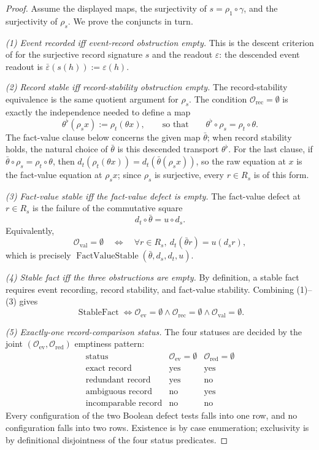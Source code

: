 \begin{proof}
Assume the displayed maps, the surjectivity of \(s=\rho_1\circ\gamma\),
and the surjectivity of \(\rho_s\).  We prove the conjuncts in
turn.

\emph{(1) Event recorded iff event-record obstruction empty.}
This is the descent criterion of  for the
surjective record signature \(s\) and the readout \(\varepsilon\): the
descended event readout is \(\bar\varepsilon(s(h)):=\varepsilon(h)\).

\emph{(2) Record stable iff record-stability obstruction empty.}
The record-stability equivalence is the same quotient argument for
\(\rho_s\).  The condition \(\mathcal O_{\mathrm{rec}}=\emptyset\) is
exactly the independence needed to define a map
\[
  \theta^{\flat}(\rho_s x):=\rho_t(\theta x),
  \qquad\text{so that}\qquad
  \theta^{\flat}\circ\rho_s=\rho_t\circ\theta.
\]
The fact-value clause below concerns the given map \(\bar\theta\);
when record stability holds, the natural choice of \(\bar\theta\) is
this descended transport \(\theta^{\flat}\). For the last clause, if
\(\bar\theta\circ\rho_s=\rho_t\circ\theta\), then
\(d_t(\rho_t(\theta x))=d_t(\bar\theta(\rho_s x))\), so the raw equation at
\(x\) is the fact-value equation at \(\rho_s x\); since \(\rho_s\) is
surjective, every \(r\in R_s\) is of this form.

\emph{(3) Fact-value stable iff the fact-value defect is empty.}
The fact-value defect at \(r\in R_s\) is the failure of the
commutative square
\[
  d_t\circ\bar\theta=u\circ d_s.
\]
Equivalently,
\[
  \mathcal O_{\mathrm{val}}=\emptyset
  \quad\Longleftrightarrow\quad
  \forall r\in R_s,\ d_t(\bar\theta r)=u(d_s r),
\]
which is precisely \(\operatorname{FactValueStable}(\bar\theta,d_s,d_t,u)\).

\emph{(4) Stable fact iff the three obstructions are empty.}
By definition, a stable fact requires event recording, record
stability, and fact-value stability.  Combining (1)--(3) gives
\[
  \operatorname{StableFact}
  \iff
  \mathcal O_{\mathrm{ev}}=\emptyset
  \wedge
  \mathcal O_{\mathrm{rec}}=\emptyset
  \wedge
  \mathcal O_{\mathrm{val}}=\emptyset.
\]

\emph{(5) Exactly-one record-comparison status.}
The four statuses are decided by the joint
\((\mathcal O_{\mathrm{ev}},\mathcal O_{\mathrm{red}})\) emptiness
pattern:
\[
\begin{array}{c|c|c}
\text{status} & \mathcal O_{\mathrm{ev}}=\emptyset
  & \mathcal O_{\mathrm{red}}=\emptyset\\
\hline
\text{exact record} & \text{yes} & \text{yes}\\
\text{redundant record} & \text{yes} & \text{no}\\
\text{ambiguous record} & \text{no} & \text{yes}\\
\text{incomparable record} & \text{no} & \text{no}
\end{array}
\]
Every configuration of the two Boolean defect tests falls into one
row, and no configuration falls into two rows.  Existence is by case
enumeration; exclusivity is by definitional disjointness of the four
status predicates.


\end{proof}
